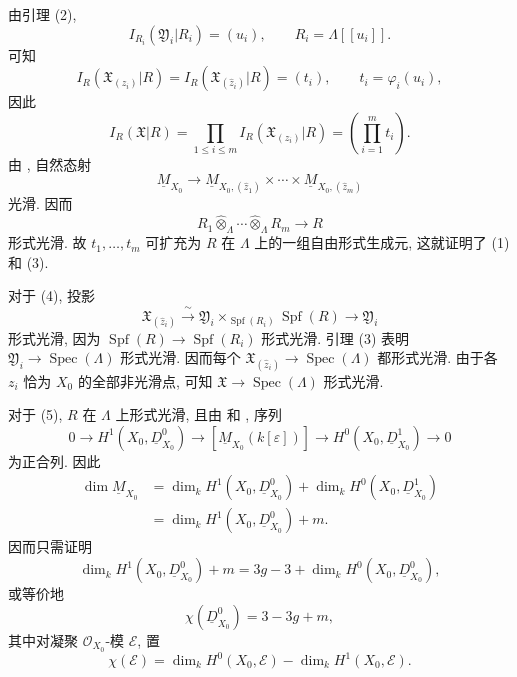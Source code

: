 由引理 (2),
\[
I_{R_i}(\mathfrak Y_i|R_i)=(u_i),
\qquad R_i=\Lambda[[u_i]].
\]
可知
\[
I_R(\mathfrak X_{(z_i)}|R)
=I_R(\mathfrak X_{(\widehat z_i)}|R)
=(t_i),
\qquad t_i=\varphi_i(u_i),
\]
因此
\[
I_R(\mathfrak X|R)
=\prod_{1\leq i\leq m}I_R(\mathfrak X_{(z_i)}|R)
=\left(\prod_{i=1}^m t_i\right).
\]
由 , 自然态射
\[
\underline M_{X_0}\longrightarrow
\underline M_{X_0,(\widehat z_1)}\times\cdots\times
\underline M_{X_0,(\widehat z_m)}
\]
光滑. 因而
\[
R_1\widehat\otimes_\Lambda\cdots
 \widehat\otimes_\Lambda R_m\longrightarrow R
\]
形式光滑. 故 $t_1,\ldots,t_m$ 可扩充为 $R$ 在 $\Lambda$ 上的一组自由形式生成元, 这就证明了 (1) 和 (3).


对于 (4), 投影
\[
\mathfrak X_{(\widehat z_i)}
 \xrightarrow{\ \sim\ }
\mathfrak Y_i\times_{\operatorname{Spf}(R_i)}
 \operatorname{Spf}(R)
 \longrightarrow\mathfrak Y_i
\]
形式光滑, 因为 $\operatorname{Spf}(R)\longrightarrow\operatorname{Spf}(R_i)$ 形式光滑. 引理 (3) 表明 $\mathfrak Y_i\longrightarrow\operatorname{Spec}(\Lambda)$ 形式光滑. 因而每个 $\mathfrak X_{(\widehat z_i)}\longrightarrow
\operatorname{Spec}(\Lambda)$ 都形式光滑. 由于各 $z_i$ 恰为 $X_0$ 的全部非光滑点, 可知 $\mathfrak X\longrightarrow\operatorname{Spec}(\Lambda)$ 形式光滑.


对于 (5), $R$ 在 $\Lambda$ 上形式光滑, 且由  和 , 序列
\[
0\longrightarrow H^1(X_0,\underline D^0_{X_0})
 \longrightarrow[\underline M_{X_0}(k[\varepsilon])]
 \longrightarrow H^0(X_0,\underline D^1_{X_0})
 \longrightarrow0
\]
为正合列. 因此
\[
\begin{aligned}
\dim\underline M_{X_0}
&=\dim_kH^1(X_0,\underline D^0_{X_0})
 +\dim_kH^0(X_0,\underline D^1_{X_0})\\
&=\dim_kH^1(X_0,\underline D^0_{X_0})+m.
\end{aligned}
\]
因而只需证明
\[
\dim_kH^1(X_0,\underline D^0_{X_0})+m
=3g-3+\dim_kH^0(X_0,\underline D^0_{X_0}),
\]
或等价地
\[
\chi(\underline D^0_{X_0})=3-3g+m,
\]
其中对凝聚 $\mathcal O_{X_0}$-模 $\mathcal E$, 置
\[
\chi(\mathcal E)
=\dim_kH^0(X_0,\mathcal E)-\dim_kH^1(X_0,\mathcal E).
\]

